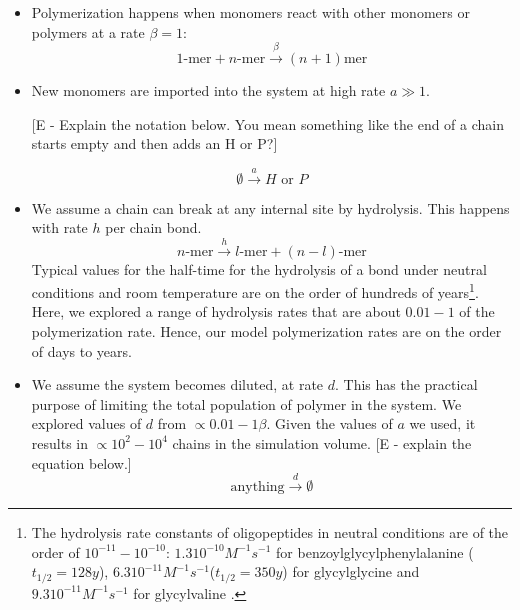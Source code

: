\documentclass[twocolumn,letterpaper]{revtex4}
\begin{document}
\begin{itemize}
 \item Polymerization happens when monomers react with other monomers or polymers at a rate $\beta 
= 1$:
\begin{equation}
 1\mbox{-mer}+n\mbox{-mer} \xrightarrow{\beta} (n+1)\mbox{mer}
\end{equation}


\item New monomers are imported into the system at high rate $a\gg1$. 

[E - Explain the notation below.  You mean something like the end of a chain starts empty and then 
adds an H or P?]

\begin{equation}
 \emptyset \xrightarrow{a} H\,\,\mbox{or}\,\,P
\end{equation}

\item We assume a chain can break at any internal site by hydrolysis.  This happens with rate $h$ 
per chain bond. 
\begin{equation}
 n\mbox{-mer} \xrightarrow{h} l\mbox{-mer}+(n-l)\mbox{-mer}
\end{equation}
Typical values for the half-time for the hydrolysis of a bond under neutral conditions and room 
temperature are on the order of hundreds of years\footnote{The hydrolysis rate constants of 
oligopeptides in neutral conditions are of the order of $10^{-11}-10^{-10}$: $1.3  10^{-10} 
M^{-1}s^{-1} $ for benzoylglycylphenylalanine ($t_{1/2} = 128 y$)\cite{Bryant1996}, $6.3  10^{-11} 
M^{-1} s^{-1}$($t_{1/2}=350 y$) for glycylglycine and $9.3 10^{-11}M^{-1} s^{-1}$ for glycylvaline
\cite{Smith1998}.}. Here, we explored a range of hydrolysis rates that are about $0.01-1$ of the 
polymerization rate.  Hence, our model polymerization rates are on the order of days to years.

\item We assume the system becomes diluted, at rate $d$.  This has the practical purpose of 
limiting the total population of polymer in the system.  We explored values of $d$ from $\propto 
0.01- 1\beta$.  Given the values of $a$ we used, it results in $\propto 10^2- 10^4$ chains in the 
simulation volume.  [E - explain the equation below.]
\begin{equation}
 \mbox{anything} \xrightarrow{d}\emptyset
\end{equation}


\end{itemize}
\end{document}
